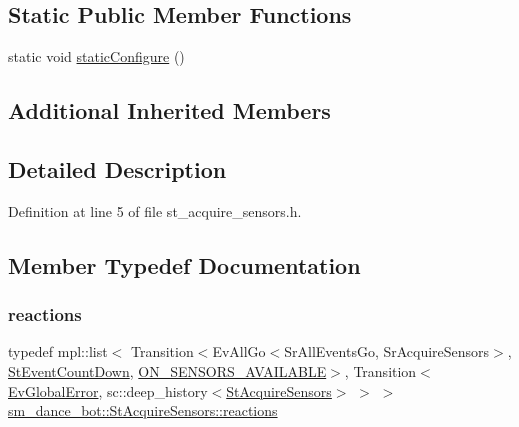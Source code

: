 \subsection*{Static Public Member Functions}
\begin{DoxyCompactItemize}
\item 
static void \hyperlink{structsm__dance__bot_1_1StAcquireSensors_a4b0a4fcd72ddfee7f81b3be252c8597f}{static\+Configure} ()
\end{DoxyCompactItemize}
\subsection*{Additional Inherited Members}


\subsection{Detailed Description}


Definition at line 5 of file st\+\_\+acquire\+\_\+sensors.\+h.



\subsection{Member Typedef Documentation}
\mbox{\label{structsm__dance__bot_1_1StAcquireSensors_a575dd244650f9a08c2a30f06f570d5a3}} 
\subsubsection{\texorpdfstring{reactions}{reactions}}
{\footnotesize\ttfamily typedef mpl\+::list$<$ Transition$<$Ev\+All\+Go$<$Sr\+All\+Events\+Go, Sr\+Acquire\+Sensors$>$, \hyperlink{structsm__dance__bot_1_1StEventCountDown}{St\+Event\+Count\+Down}, \hyperlink{structsm__dance__bot_1_1StAcquireSensors_1_1ON__SENSORS__AVAILABLE}{O\+N\+\_\+\+S\+E\+N\+S\+O\+R\+S\+\_\+\+A\+V\+A\+I\+L\+A\+B\+LE}$>$, Transition$<$\hyperlink{structsm__dance__bot_1_1EvGlobalError}{Ev\+Global\+Error}, sc\+::deep\+\_\+history$<$\hyperlink{structsm__dance__bot_1_1StAcquireSensors}{St\+Acquire\+Sensors}$>$ $>$ $>$ \hyperlink{structsm__dance__bot_1_1StAcquireSensors_a575dd244650f9a08c2a30f06f570d5a3}{sm\+\_\+dance\+\_\+bot\+::\+St\+Acquire\+Sensors\+::reactions}}



